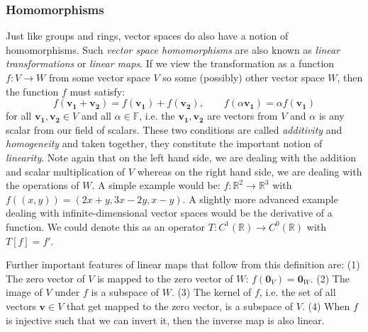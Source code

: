 \subsubsection{Homomorphisms}
Just like groups and rings, vector spaces do also have a notion of homomorphisms. Such \emph{vector space homomorphisms} are also known as \emph{linear transformations} or \emph{linear maps}. If we view the transformation as a function $f: V \rightarrow W$ from some vector space $V$ so some (possibly) other vector space $W$, then the function $f$ must satisfy:
\begin{equation}
  f(\mathbf{v_1} + \mathbf{v_2}) = f(\mathbf{v_1}) + f(\mathbf{v_2}), \qquad
  f(\alpha \mathbf{v_1}) = \alpha f(\mathbf{v_1})
\end{equation}
for all $\mathbf{v_1, v_2} \in V$ and all $\alpha \in \mathbb{F}$, i.e. the $\mathbf{v_1, v_2}$ are vectors from $V$ and $\alpha$ is any scalar from our field of scalars. These two conditions are called \emph{additivity} and \emph{homogeneity} and taken together, they constitute the important notion of \emph{linearity}. Note again that on the left hand side, we are dealing with the addition and scalar multiplication of $V$ whereas on the right hand side, we are dealing with the operations of $W$. A simple example would be: $f: \mathbb{R}^2 \rightarrow \mathbb{R}^3$ with $f((x,y)) = (2 x + y, 3 x - 2 y, x - y)$. A slightly more advanced example dealing with infinite-dimensional vector spaces would be the derivative of a function. We could denote this as an operator $T: C^1(\mathbb{R}) \rightarrow C^0(\mathbb{R}) $ with $T[f] = f'$.

\medskip
Further important features of linear maps that follow from this definition are: (1) The zero vector of $V$ is mapped to the zero vector of $W$: $f(\mathbf{0}_V) = \mathbf{0}_W$. (2) The image of $V$ under $f$ is a subspace of $W$. (3) The kernel of $f$, i.e. the set of all vectors $\mathbf{v} \in V$ that get mapped to the zero vector, is a subspace of $V$. (4) When $f$ is injective such that we can invert it, then the inverse map is also linear.






